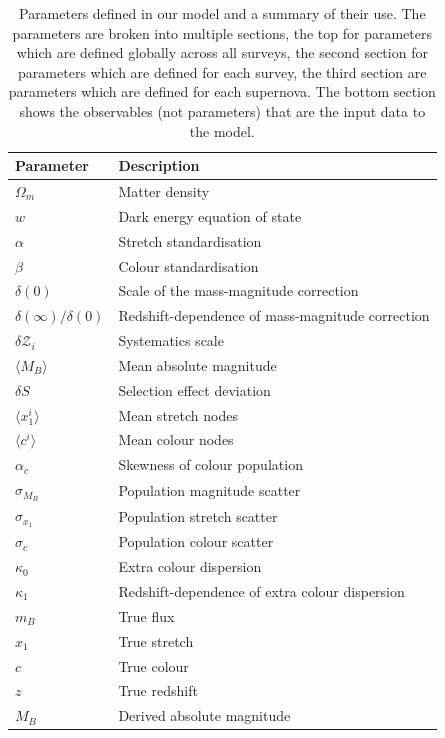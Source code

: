 \documentclass[a4paper,fleqn,usenatbib]{mnras}
\begin{document}
\begin{table}
	\centering
	\caption{ Parameters defined in our model and a summary of their use. The parameters are broken into multiple sections, the top for parameters which are defined globally across all surveys, the second section for parameters which are defined for each survey, the third section are parameters which are defined for each supernova. The bottom section shows the observables (not parameters) that are the input data to the model.}
	\label{tab:param_summary}
	\begin{tabular}{ll}
		\hline
		Parameter & Description \\
		\hline
		$\Omega_m$  & Matter density  \\
		$w$  &  Dark energy equation of state  \\
		$\alpha$ & Stretch standardisation   \\
		$\beta$         &  Colour standardisation   \\
		$\delta(0)$ & Scale of the mass-magnitude correction\\
		$\delta(\infty)/\delta(0)$ & Redshift-dependence of mass-magnitude correction\\
		$\delta\mathcal{Z}_i$ & Systematics scale\\
		$\langle M_B \rangle$ & Mean absolute magnitude \\
		\hline
		$\delta S$ & Selection effect deviation \\
		$\langle x_1^i \rangle$ & Mean stretch nodes\\
		$\langle c^i \rangle$ & Mean colour nodes\\
		$\alpha_c$ & Skewness of colour population \\
		$\sigma_{M_B}$ & Population magnitude scatter \\
		$\sigma_{x_1}$ & Population stretch scatter \\
		$\sigma_{c}$ & Population colour scatter \\
		$\kappa_{0}$ & Extra colour dispersion\\
		$\kappa_{1}$ & Redshift-dependence of extra colour dispersion\\
		\hline
		$m_B$ & True flux\\
		$x_1$ & True stretch \\
		$c$ & True colour \\
		$z$ & True redshift \\
		$M_B$ & Derived absolute magnitude \\

\end{tabular}
\end{table}
\end{document}
